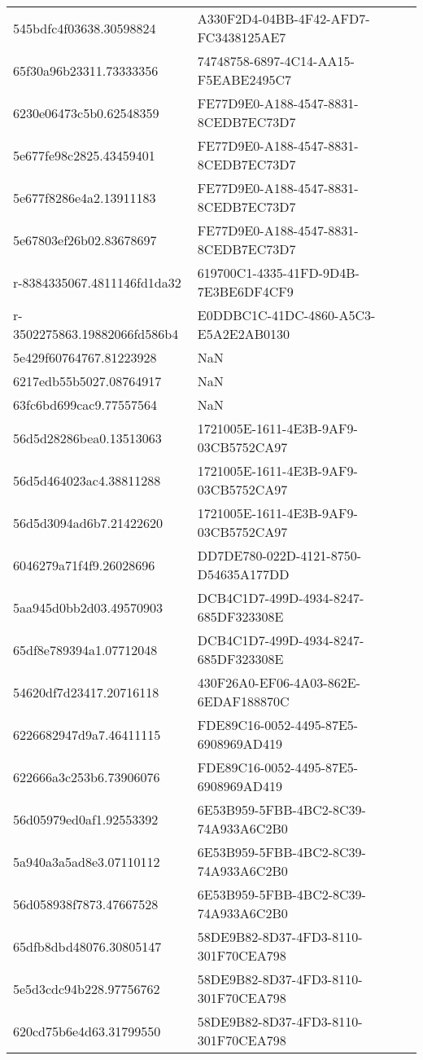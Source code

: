 \begin{tabular}{ll}
545bdfc4f03638.30598824 & A330F2D4-04BB-4F42-AFD7-FC3438125AE7 \\
65f30a96b23311.73333356 & 74748758-6897-4C14-AA15-F5EABE2495C7 \\
6230e06473c5b0.62548359 & FE77D9E0-A188-4547-8831-8CEDB7EC73D7 \\
5e677fe98c2825.43459401 & FE77D9E0-A188-4547-8831-8CEDB7EC73D7 \\
5e677f8286e4a2.13911183 & FE77D9E0-A188-4547-8831-8CEDB7EC73D7 \\
5e67803ef26b02.83678697 & FE77D9E0-A188-4547-8831-8CEDB7EC73D7 \\
r-8384335067.4811146fd1da32 & 619700C1-4335-41FD-9D4B-7E3BE6DF4CF9 \\
r-3502275863.19882066fd586b4 & E0DDBC1C-41DC-4860-A5C3-E5A2E2AB0130 \\
5e429f60764767.81223928 & NaN \\
6217edb55b5027.08764917 & NaN \\
63fc6bd699cac9.77557564 & NaN \\
56d5d28286bea0.13513063 & 1721005E-1611-4E3B-9AF9-03CB5752CA97 \\
56d5d464023ac4.38811288 & 1721005E-1611-4E3B-9AF9-03CB5752CA97 \\
56d5d3094ad6b7.21422620 & 1721005E-1611-4E3B-9AF9-03CB5752CA97 \\
6046279a71f4f9.26028696 & DD7DE780-022D-4121-8750-D54635A177DD \\
5aa945d0bb2d03.49570903 & DCB4C1D7-499D-4934-8247-685DF323308E \\
65df8e789394a1.07712048 & DCB4C1D7-499D-4934-8247-685DF323308E \\
54620df7d23417.20716118 & 430F26A0-EF06-4A03-862E-6EDAF188870C \\
6226682947d9a7.46411115 & FDE89C16-0052-4495-87E5-6908969AD419 \\
622666a3c253b6.73906076 & FDE89C16-0052-4495-87E5-6908969AD419 \\
56d05979ed0af1.92553392 & 6E53B959-5FBB-4BC2-8C39-74A933A6C2B0 \\
5a940a3a5ad8e3.07110112 & 6E53B959-5FBB-4BC2-8C39-74A933A6C2B0 \\
56d058938f7873.47667528 & 6E53B959-5FBB-4BC2-8C39-74A933A6C2B0 \\
65dfb8dbd48076.30805147 & 58DE9B82-8D37-4FD3-8110-301F70CEA798 \\
5e5d3cdc94b228.97756762 & 58DE9B82-8D37-4FD3-8110-301F70CEA798 \\
620cd75b6e4d63.31799550 & 58DE9B82-8D37-4FD3-8110-301F70CEA798 \\

\end{tabular}
